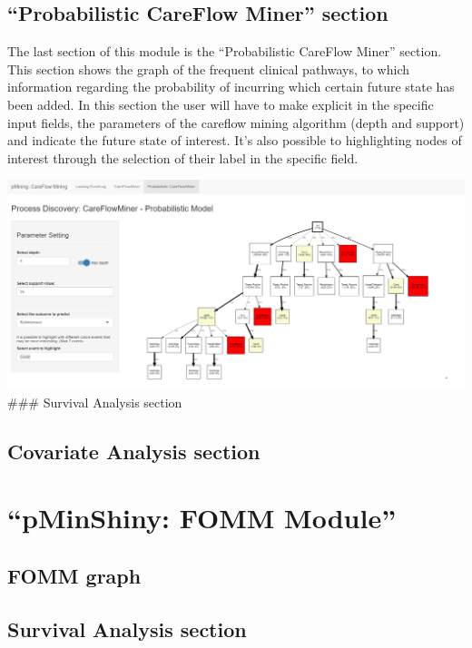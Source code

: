 \documentclass[
]{book}
\begin{document}
\hypertarget{probabilistic-careflow-miner-section}{%
\subsection{``Probabilistic CareFlow Miner'' section}\label{probabilistic-careflow-miner-section}}

The last section of this module is the ``Probabilistic CareFlow Miner'' section. This section shows the graph of the frequent clinical pathways, to which information regarding the probability of incurring which certain future state has been added. In this section the user will have to make explicit in the specific input fields, the parameters of the careflow mining algorithm (depth and support) and indicate the future state of interest. It's also possible to highlighting nodes of interest through the selection of their label in the specific field.

\includegraphics[width=1\textwidth,height=\textheight]{images/CFM_sect2.png}
\#\#\# Survival Analysis section

\hypertarget{covariate-analysis-section}{%
\subsection{Covariate Analysis section}\label{covariate-analysis-section}}

\hypertarget{pminshiny-fomm-module}{%
\section{``pMinShiny: FOMM Module''}\label{pminshiny-fomm-module}}

\hypertarget{fomm-graph}{%
\subsection{FOMM graph}\label{fomm-graph}}

\hypertarget{survival-analysis-section}{%
\subsection{Survival Analysis section}\label{survival-analysis-section}}
\end{document}
